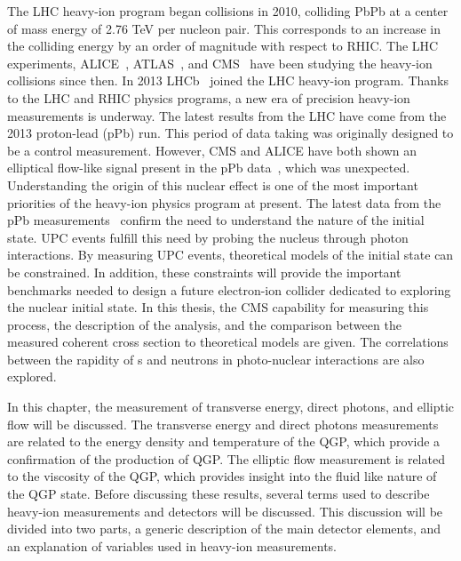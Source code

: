   The LHC heavy-ion program began collisions in 2010, colliding PbPb at 
    a center of mass energy of 2.76 TeV per nucleon pair. 
  This corresponds to an increase in the colliding energy by an order of 
    magnitude with respect to RHIC. 
  The LHC experiments, ALICE~\cite{Aamodt:2008zz}, ATLAS~\cite{Aad:2008zzm}, and CMS~\cite{tCmsE} have been studying the heavy-ion 
    collisions since then. 
  In 2013 LHCb~\cite{Alves:2008zz} joined the LHC heavy-ion program. 
  Thanks to the LHC and RHIC physics programs, a new era of precision
    heavy-ion measurements is underway. 
  The latest results from the LHC have come from the 2013 proton-lead (pPb)
    run.
  This period of data taking was originally designed to be a control 
    measurement.
  However, CMS and ALICE have both shown an elliptical flow-like signal present
    in the pPb data~\cite{Chatrchyan:2013nka,Abelev:2012ola}, which was unexpected.
  Understanding the origin of this nuclear effect is one of the most important
    priorities of the heavy-ion physics program at present. 
  The latest data from the pPb measurements~\cite{Roland:2014jsa} confirm the need to 
    understand the nature of the initial state. 
  UPC events fulfill this need by probing the nucleus through photon 
    interactions.
  By measuring UPC \JPsi{} events, theoretical models of the initial state can 
    be constrained.
  In addition, these constraints will provide the important benchmarks needed 
    to design a future electron-ion collider dedicated to exploring the nuclear
    initial state. 
  In this thesis, the CMS capability for measuring this process, the 
    description of the analysis, and the comparison between the measured 
    coherent \JPsi{} cross section to theoretical models are given.
  The correlations between the rapidity of \JPsi{}s and neutrons in 
    photo-nuclear interactions are also explored. 

  In this chapter, the measurement of transverse energy, direct photons, and
    elliptic flow will be discussed.
  The transverse energy and direct photons measurements are related to 
    the energy density and temperature of the QGP, which provide a 
    confirmation of the production of QGP.
  The elliptic flow measurement is related to the viscosity of the QGP, which
    provides insight into the fluid like nature of the QGP state.
  Before discussing these results, several terms used to describe heavy-ion
    measurements and detectors will be discussed. 
  This discussion will be divided into two parts, a generic description of 
    the main detector elements, and an explanation of variables used in
    heavy-ion measurements.
  

